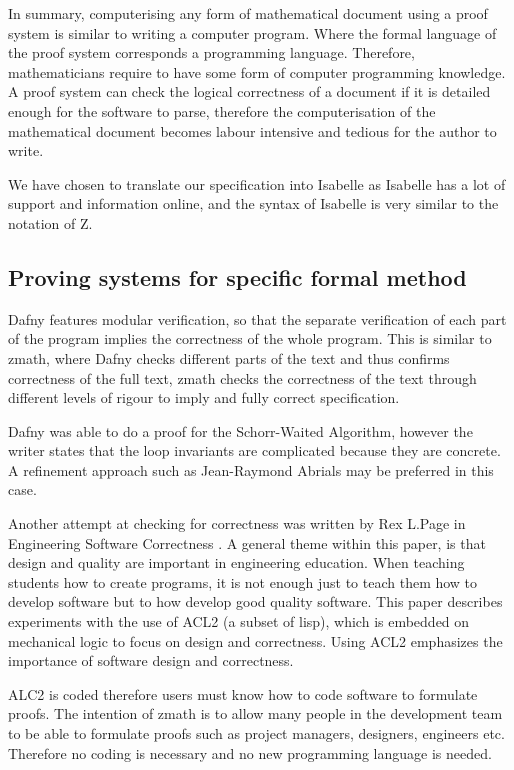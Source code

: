 In summary, computerising any form of mathematical document using a proof
system is similar to writing a computer program. Where the formal language of
the proof system corresponds a programming language. Therefore, mathematicians
require to have some form of computer programming knowledge. A proof system can
check the logical correctness of a document if it is detailed enough for the
software to parse, therefore the computerisation of the mathematical document
becomes labour intensive and tedious for the author to write.

We have chosen to translate our specification into Isabelle as Isabelle has a
lot of support and information online, and the syntax of Isabelle is very
similar to the notation of Z.

\subsection{Proving systems for specific formal method}


Dafny \cite{dafny} features modular verification, so that the separate
verification of each part of the program implies the correctness of the whole
program. This is similar to \gls{zmath}, where Dafny checks different parts of
the text and thus confirms correctness of the full text, \gls{zmath} checks the
correctness of the text through different levels of rigour to imply and fully
correct specification.

Dafny was able to do a proof for the Schorr-Waited Algorithm, however the writer
states that the loop invariants are complicated because they are concrete. A
refinement approach such as Jean-Raymond Abrials \cite{abrial} may be preferred
in this case.  

Another attempt at checking for correctness was written by Rex L.Page in
Engineering Software Correctness \cite{engineeringsoftwarecorrectness}. A
general theme within this paper, is that design and quality are important in
engineering education. When teaching students how to create programs, it is not
enough just to teach them how to develop software but to how develop good
quality software. This paper describes experiments with the use of ACL2 (a
subset of lisp), which is embedded on mechanical logic to focus on design and
correctness. Using ACL2 emphasizes the importance of software design and
correctness. 

ALC2 is coded therefore users must know how to code software to formulate
proofs. The intention of \gls{zmath} is to allow many people in the development
team to be able to formulate proofs such as project managers, designers,
engineers etc. Therefore no coding is necessary and no new programming language
is needed.

